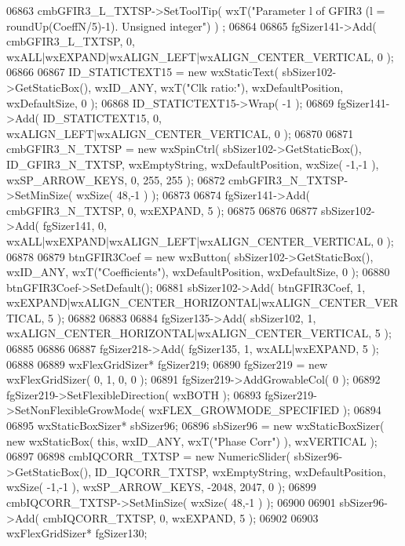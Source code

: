 \begin{DoxyCode}
06863     cmbGFIR3_L_TXTSP->SetToolTip( wxT(\textcolor{stringliteral}{"Parameter l of GFIR3 (l = roundUp(CoeffN/5)-1). Unsigned integer"}) )
      ;
06864     
06865     fgSizer141->Add( cmbGFIR3_L_TXTSP, 0, wxALL|wxEXPAND|wxALIGN\_LEFT|wxALIGN\_CENTER\_VERTICAL, 0 );
06866     
06867     ID_STATICTEXT15 = \textcolor{keyword}{new} wxStaticText( sbSizer102->GetStaticBox(), wxID\_ANY, wxT(\textcolor{stringliteral}{"Clk ratio:"}), 
      wxDefaultPosition, wxDefaultSize, 0 );
06868     ID_STATICTEXT15->Wrap( -1 );
06869     fgSizer141->Add( ID_STATICTEXT15, 0, wxALIGN\_LEFT|wxALIGN\_CENTER\_VERTICAL, 0 );
06870     
06871     cmbGFIR3_N_TXTSP = \textcolor{keyword}{new} wxSpinCtrl( sbSizer102->GetStaticBox(), 
      ID_GFIR3_N_TXTSP, wxEmptyString, wxDefaultPosition, wxSize( -1,-1 ), wxSP\_ARROW\_KEYS, 0, 255, 255 );
06872     cmbGFIR3_N_TXTSP->SetMinSize( wxSize( 48,-1 ) );
06873     
06874     fgSizer141->Add( cmbGFIR3_N_TXTSP, 0, wxEXPAND, 5 );
06875     
06876     
06877     sbSizer102->Add( fgSizer141, 0, wxALL|wxEXPAND|wxALIGN\_LEFT|wxALIGN\_CENTER\_VERTICAL, 0 );
06878     
06879     btnGFIR3Coef = \textcolor{keyword}{new} wxButton( sbSizer102->GetStaticBox(), wxID\_ANY, wxT(\textcolor{stringliteral}{"Coefficients"}), 
      wxDefaultPosition, wxDefaultSize, 0 );
06880     btnGFIR3Coef->SetDefault(); 
06881     sbSizer102->Add( btnGFIR3Coef, 1, wxEXPAND|wxALIGN\_CENTER\_HORIZONTAL|wxALIGN\_CENTER\_VERTICAL, 5 );
06882     
06883     
06884     fgSizer135->Add( sbSizer102, 1, wxALIGN\_CENTER\_HORIZONTAL|wxALIGN\_CENTER\_VERTICAL, 5 );
06885     
06886     
06887     fgSizer218->Add( fgSizer135, 1, wxALL|wxEXPAND, 5 );
06888     
06889     wxFlexGridSizer* fgSizer219;
06890     fgSizer219 = \textcolor{keyword}{new} wxFlexGridSizer( 0, 1, 0, 0 );
06891     fgSizer219->AddGrowableCol( 0 );
06892     fgSizer219->SetFlexibleDirection( wxBOTH );
06893     fgSizer219->SetNonFlexibleGrowMode( wxFLEX\_GROWMODE\_SPECIFIED );
06894     
06895     wxStaticBoxSizer* sbSizer96;
06896     sbSizer96 = \textcolor{keyword}{new} wxStaticBoxSizer( \textcolor{keyword}{new} wxStaticBox( \textcolor{keyword}{this}, wxID\_ANY, wxT(\textcolor{stringliteral}{"Phase Corr"}) ), wxVERTICAL );
06897     
06898     cmbIQCORR_TXTSP = \textcolor{keyword}{new} NumericSlider( sbSizer96->GetStaticBox(), 
      ID_IQCORR_TXTSP, wxEmptyString, wxDefaultPosition, wxSize( -1,-1 ), wxSP\_ARROW\_KEYS, -2048, 2047, 0 );
06899     cmbIQCORR_TXTSP->SetMinSize( wxSize( 48,-1 ) );
06900     
06901     sbSizer96->Add( cmbIQCORR_TXTSP, 0, wxEXPAND, 5 );
06902     
06903     wxFlexGridSizer* fgSizer130;

\end{DoxyCode}
